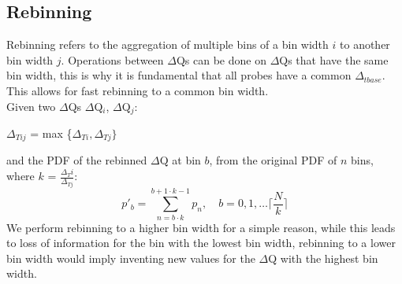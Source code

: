         \subsection{Rebinning}
            Rebinning refers to the aggregation of multiple bins of a bin width $i$ to another bin width $j$. 
            Operations between $\Delta$Qs can be done on $\Delta$Qs that have the same bin width, this is why it is fundamental that all probes have a common $\Delta_{tbase}$. This allows for fast rebinning to a common bin width. \\
            Given two $\Delta$Qs $\Delta$Q$_i$, $\Delta$Q$_j$:
            \begin{center}
                $\Delta_{Tij}$ = max \{$\Delta_{Ti}, \Delta_{Tj} \}$
            \end{center}
            and the PDF of the rebinned $\Delta$Q at bin $b$, from the original PDF of $n$ bins, where $k$ = $\frac{\Delta{_Ti}}{\Delta_{Tj}}$:
            \begin{equation}
                p'_b = \sum_{n=b \cdot k}^{b+ 1 \cdot k - 1} p_n, \quad b=0,1,\dots \lceil \frac{N}{k} \rceil  
            \end{equation}
            We perform rebinning to a higher bin width for a simple reason, while this leads to loss of information for the bin with the lowest bin width, rebinning to a lower bin width would imply inventing new values for the $\Delta$Q with the highest bin width.
